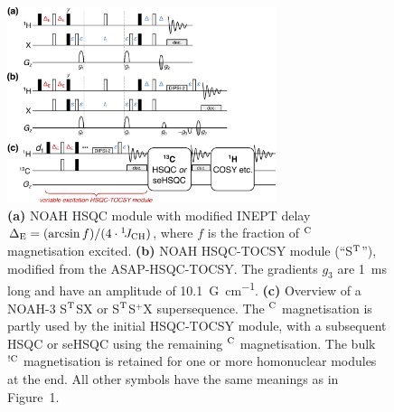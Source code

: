 \documentclass[final,twocolumn]{elsarticle}
\newcommand*{\noahS}{S}
\newcommand*{\noahSp}{S$^+$}
\newcommand*{\noahSt}{S$\rm ^T$}
\newcommand*{\noahX}{X}
\newcommand*{\onejch}{{}^{1}\!J_{\ce{CH}}}
\newcommand*{\magn}[1]{\ce{^1H}$^{#1}$}
\newcommand*{\magnnot}[1]{\ce{^1H}$^{!#1}$}
\begin{document}
\begin{figure}[!ht]
    \centering
    \includegraphics[width=0.7\textwidth]{FIG4.png}
    \caption{
        \textbf{(a)} NOAH HSQC module with modified INEPT delay $\Delta_{\mathrm{E}} = (\arcsin f)/(4\cdot\onejch)$, where $f$ is the fraction of \magn{\ce{C}} magnetisation excited.
        \textbf{(b)} NOAH HSQC-TOCSY module (``\noahSt{}''), modified from the ASAP-HSQC-TOCSY.\cite{Becker2019JMR}
        The gradients $g_3$ are \SI{1}{\ms} long and have an amplitude of \SI{10.1}{G\per\cm}.
        \textbf{(c)} Overview of a NOAH-3 \noahSt{}\noahS{}\noahX{} or \noahSt{}\noahSp{}\noahX{} supersequence.
        The \magn{\ce{C}} magnetisation is partly used by the initial HSQC-TOCSY module, with a subsequent HSQC or seHSQC using the remaining \magn{\ce{C}} magnetisation.
        The bulk \magnnot{\ce{C}} magnetisation is retained for one or more homonuclear modules at the end.
        All other symbols have the same meanings as in Figure~1.
    }
    \label{fig:pprogs_hsqct}
\end{figure}
\end{document}
